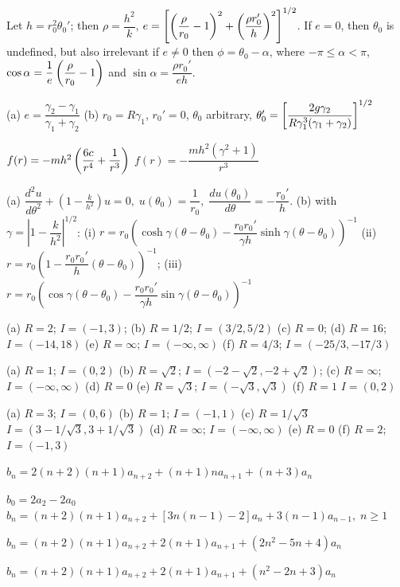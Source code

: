 Let $h=r_0^2\theta_0'$; then $\rho=\dfrac{h^2}{k}$,\;
$e=\displaystyle{\left[\left(\frac{\rho}{r_0}-1\right)^2+\left(\frac{\rho r_0'}{h}\right)^2\right]^{1/2}}$. If $e=0$, then $\theta_0$ is undefined,
but also irrelevant   if $e\ne0$ then $\phi=\theta_0-\alpha$, where
$-\pi\le\alpha<\pi$, $\cos\alpha=\displaystyle{\frac{1}{e}\left(\frac{\rho}{r_0}-1\right)}$ and $\sin\alpha=\dfrac{\rho r_0'}{eh}$.

(a) $e=\dfrac{\gamma_2-\gamma_1}{\gamma_1+\gamma_2}$
(b) $r_0=R\gamma_1$,\; $r_0'=0$,\; $\theta_0$ arbitrary,\;
$\theta_0'=\displaystyle{\left[\frac{2g\gamma_2}{R\gamma_1^3(\gamma_1+\gamma_2)}\right]^{1/2}}$

 $f(r)=-mh^2\displaystyle\left(\frac{6c}{r^4}+\frac{1}{r^3}\right)$
 $f(r)=-\dfrac{mh^2(\gamma^2+1)}{ r^3}$

(a) $\dfrac{d^2u}{d\theta^2}+\left(1-\frac{k}{h^2}\right)u=0,\;
u(\theta_0)=\dfrac{1}{r_0},\; \dfrac{du(\theta_0)}{d\theta}=-\dfrac{r_0'}{h}$.
(b) with $\gamma=\left|1-\dfrac{k}{h^2}\right|^{1/2}$: (i)
$r=r_0\left( \cosh\gamma(\theta-\theta_0)-\dfrac{r_0r_0'}{\gamma
h}\sinh\gamma(\theta-\theta_0)\right)^{-1}$   (ii) $r=r_0\left(1
-\dfrac{r_0r_0'}{h}(\theta-\theta_0)\right)^{-1}$;   (iii)
$r=r_0\left( \cos\gamma(\theta-\theta_0)-\dfrac{r_0r_0'}{\gamma
h}\sin\gamma(\theta-\theta_0)\right)^{-1}$



(a) $R=2$;   $I=(-1,3)$;   (b) $R=1/2$;   $I=(3/2,5/2)$
(c)  $R=0$;   (d) $R=16$; $I=(-14,18)$
(e) $R=\infty$;   $I=(-\infty,\infty)$ (f) $R=4/3$;
$I=(-25/3,-17/3)$

(a) $R=1$;   $I=(0,2)$   (b) $R=\sqrt2$;
$I=(-2-\sqrt2,-2+\sqrt2)$; (c) $R=\infty$; $I=(-\infty,\infty)$ (d) $R=0$
(e) $R=\sqrt3$; $I=(-\sqrt3,\sqrt3)$ (f) $R=1$   $I=(0,2)$

(a) $R=3$;   $I=(0,6)$   (b) $R=1$;   $I=(-1,1)$
(c) $R=1/\sqrt3$
$I=(3-1/\sqrt3,3+1/\sqrt3)$   (d)
$R=\infty$;
$I=(-\infty,\infty)$ (e) $R=0$   (f) $R=2$;
$I=(-1,3)$

$b_n=2(n+2)(n+1)a_{n+2}+(n+1)na_{n+1}+(n+3)a_n$

$b_0=2a_2-2a_0$
$b_n=(n+2)(n+1)a_{n+2}+[3n(n-1)-2]a_n+3(n-1)a_{n-1},\;   n\ge1$

$b_n=(n+2)(n+1)a_{n+2}+2(n+1)a_{n+1}+(2n^2-5n+4)a_n$

$b_n=(n+2)(n+1)a_{n+2}+2(n+1)a_{n+1}+(n^2-2n+3)a_n$

